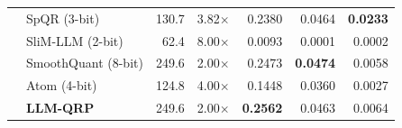 \documentclass{article}
\begin{document}
\begin{table}[htbp]
\begin{tabular}{@{} l l rr rrr @{}}
     & SpQR (3-bit) & 130.7 & 3.82$\times$ & 0.2380 & 0.0464 & \textbf{0.0233} \\
     & SliM-LLM (2-bit) & 62.4 & 8.00$\times$ & 0.0093 & 0.0001 & 0.0002 \\
     & SmoothQuant (8-bit) & 249.6 & 2.00$\times$ & 0.2473 & \textbf{0.0474} & 0.0058 \\
     & Atom (4-bit) & 124.8 & 4.00$\times$ & 0.1448 & 0.0360 & 0.0027 \\
     & \textbf{LLM-QRP} & 249.6 & 2.00$\times$ & \textbf{0.2562} & 0.0463 & 0.0064 \\
    \bottomrule
  \end{tabular}
\end{table}
\end{document}
